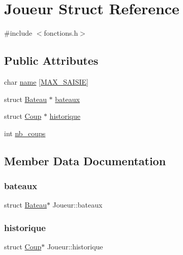\hypertarget{structJoueur}{}\section{Joueur Struct Reference}
\label{structJoueur}


{\ttfamily \#include $<$fonctions.\+h$>$}

\subsection*{Public Attributes}
\begin{DoxyCompactItemize}
\item 
char \hyperlink{structJoueur_ab612f3b383ec2463e302d1f8ba5fc4fd}{name} \mbox{[}\hyperlink{fonctions_8h_a2277af00d169389a0db61a0dbefa2e05}{M\+A\+X\+\_\+\+S\+A\+I\+S\+IE}\mbox{]}
\item 
struct \hyperlink{structBateau}{Bateau} $\ast$ \hyperlink{structJoueur_a950c3ca390a307cfd21d7095b4d5554e}{bateaux}
\item 
struct \hyperlink{structCoup}{Coup} $\ast$ \hyperlink{structJoueur_a76f3717b590da6e1dc3557fd6bdc0050}{historique}
\item 
int \hyperlink{structJoueur_af20d1286a923e294405ced5f3c5484cd}{nb\+\_\+coups}
\end{DoxyCompactItemize}


\subsection{Member Data Documentation}
\hypertarget{structJoueur_a950c3ca390a307cfd21d7095b4d5554e}{}\label{structJoueur_a950c3ca390a307cfd21d7095b4d5554e} 
\subsubsection{\texorpdfstring{bateaux}{bateaux}}
{\footnotesize\ttfamily struct \hyperlink{structBateau}{Bateau}$\ast$ Joueur\+::bateaux}

\hypertarget{structJoueur_a76f3717b590da6e1dc3557fd6bdc0050}{}\label{structJoueur_a76f3717b590da6e1dc3557fd6bdc0050} 
\subsubsection{\texorpdfstring{historique}{historique}}
{\footnotesize\ttfamily struct \hyperlink{structCoup}{Coup}$\ast$ Joueur\+::historique}

